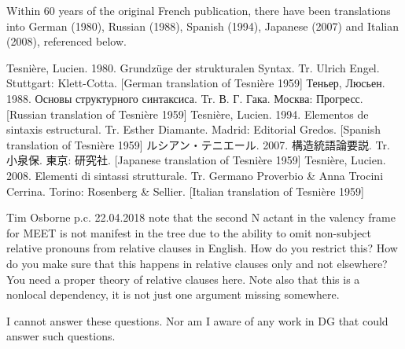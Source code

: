 Within 60 years of the original French publication, there have been translations into German (1980), Russian (1988), Spanish (1994), Japanese (2007) and Italian (2008), referenced below.

Tesnière, Lucien. 1980. Grundzüge der strukturalen Syntax. Tr. Ulrich Engel. Stuttgart: Klett-Cotta. [German translation of Tesnière 1959]
Теньер, Люсьен. 1988. Основы структурного синтаксиса. Tr.  В. Г. Гака. Москва: Прогресс. [Russian translation of Tesnière 1959]
Tesnière, Lucien. 1994. Elementos de sintaxis estructural. Tr. Esther Diamante. Madrid: Editorial Gredos. [Spanish translation of Tesnière 1959]
ルシアン・テニエール. 2007. 構造統語論要説. Tr. 小泉保. 東京: 研究社. [Japanese translation of Tesnière 1959]
Tesnière, Lucien. 2008. Elementi di sintassi strutturale. Tr. Germano Proverbio & Anna Trocini Cerrina. Torino: Rosenberg & Sellier. [Italian translation of Tesnière 1959]


Tim Osborne p.c. 22.04.2018
note that the second N actant in the valency frame for MEET is not manifest in the tree due to the ability to omit non-subject relative pronouns from relative clauses in English. How do you restrict this? How do you make sure that this happens in relative clauses only and not elsewhere? You need a proper theory of relative clauses here. Note also that this is a nonlocal dependency, it is not just one argument missing somewhere.

I cannot answer these questions. Nor am I aware of any work in DG that could answer such questions. 

\fi





